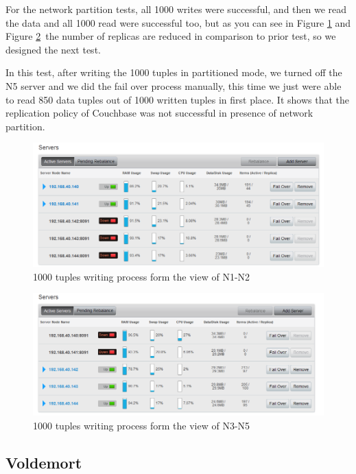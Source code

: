 \documentclass[a4paper]{article}
\begin{document}
For the network partition tests, all 1000 writes were successful, and then we read the data and all 1000 read were successful too, but as you can see in Figure \ref{fig:partition1} and Figure \ref{fig:partition2}\, the number of replicas are reduced in comparison to prior test, so we designed the next test.

In this test, after writing the 1000 tuples in partitioned mode, we turned off the N5 server and we did the fail over process manually, this time we just were able to read 850 data tuples out of 1000 written tuples in first place. It shows that the replication policy of Couchbase was not successful in presence of network partition. 

\begin{figure}[H]
	\centering
	\includegraphics[width=\textwidth]{partition1}
	\caption{1000 tuples writing process form the view of N1-N2}
	\label{fig:partition1}
\end{figure}

\begin{figure}[H]
	\centering
	\includegraphics[width=\textwidth]{partition2}
	\caption{1000 tuples writing process form the view of N3-N5}
	\label{fig:partition2}
\end{figure}

\subsection{Voldemort}
\end{document}
